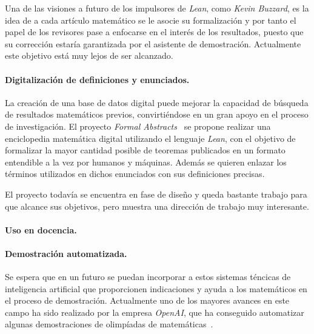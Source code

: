 Una de las visiones a futuro de los impulsores de \textit{Lean}, como
\textit{Kevin Buzzard}, es la idea de a cada artículo matemático se le asocie su
formalización y por tanto el papel de los revisores pase a enfocarse en el
interés de los resultados, puesto que su corrección estaría garantizada por el
asistente de demostración. Actualmente este objetivo está muy lejos de ser
alcanzado.

\paragraph{Digitalización de definiciones y enunciados.}

La creación de una base de datos digital puede mejorar la capacidad de búsqueda
de resultados matemáticos previos, convirtiéndose en un gran apoyo en el proceso
de investigación. El proyecto \textit{Formal Abstracts}~\cite{halesFormalAbstracts}
se propone realizar una enciclopedia matemática digital utilizando el lenguaje
\textit{Lean}, con el objetivo de formalizar la mayor cantidad posible de
teoremas publicados en un formato entendible a la vez por humanos y máquinas.
Además se quieren enlazar los términos utilizados en dichos enunciados con sus
definiciones precisas.

El proyecto todavía se encuentra en fase de diseño y queda bastante trabajo para
que alcance sus objetivos, pero muestra una dirección de trabajo muy
interesante.

\paragraph{Uso en docencia.}

\paragraph{Demostración automatizada.} Se espera que en un
futuro se puedan incorporar a estos sistemas téncicas de inteligencia artificial
que proporcionen indicaciones y ayuda a los matemáticos en el proceso de
demostración. Actualmente uno de los mayores avances en este campo ha sido
realizado por la empresa \textit{OpenAI}, que ha conseguido automatizar algunas
demostraciones de olimpíadas de matemáticas~\cite{poluSolvingFormalMath}.





